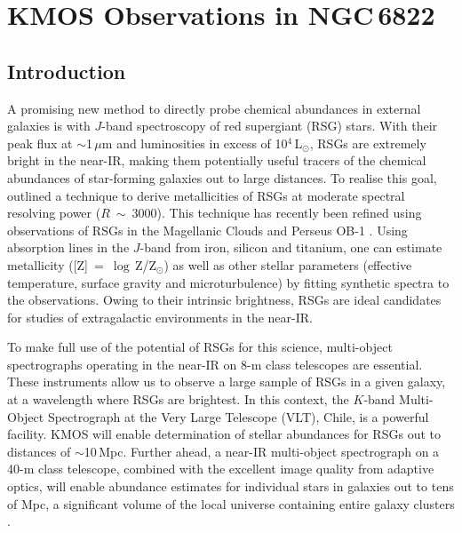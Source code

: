 \chapter{KMOS Observations in NGC\,6822}
\label{ch:ngc6822}
\renewcommand{\headrulewidth}{1pt}

\section{Introduction}

\label{sec:ngc6822intro}
A promising new method to directly probe chemical abundances in external galaxies is with $J$-band spectroscopy of red supergiant (RSG) stars.
With their peak flux at
$\sim$1\,$\mu$m and luminosities in excess of
10$^4$\,L$_\odot$, RSGs are extremely bright in the near-IR,
making them potentially useful tracers of the chemical abundances of star-forming galaxies out to large distances.
To realise this goal,
\cite{2010MNRAS.407.1203D} outlined a technique to derive metallicities of RSGs at moderate spectral resolving power
($R$~$\sim$~3000).
This technique has recently been refined using observations of RSGs in the Magellanic Clouds
\citep{2015ApJ...806...21D} and Perseus OB-1
\citep{2014ApJ...788...58G}.
Using absorption lines in the $J$-band from iron, silicon and titanium, one can estimate metallicity
([Z]~=~$\log$\,Z/Z$_{\odot}$) as well as other stellar parameters
(effective temperature, surface gravity and microturbulence) by fitting synthetic spectra to the observations.
Owing to their intrinsic brightness,
RSGs are ideal candidates for studies of extragalactic environments in the near-IR.

To make full use of the potential of RSGs for this science, multi-object spectrographs operating in the near-IR on 8-m class telescopes are essential.
These instruments allow us to observe a large sample of RSGs in a given galaxy, at a wavelength where RSGs are brightest.
In this context, the $K$-band Multi-Object Spectrograph
\citep[KMOS;][]{2013Msngr.151...21S} at the Very Large Telescope (VLT), Chile, is a powerful facility.
KMOS will enable determination of stellar abundances for RSGs out to distances of $\sim$10\,Mpc.
Further ahead, a near-IR multi-object spectrograph on a 40-m class telescope, combined with the excellent image quality from adaptive optics,
will enable abundance estimates for individual stars in galaxies out to tens of Mpc,
a significant volume of the local universe containing entire galaxy clusters
\citep{2011A&A...527A..50E}.

